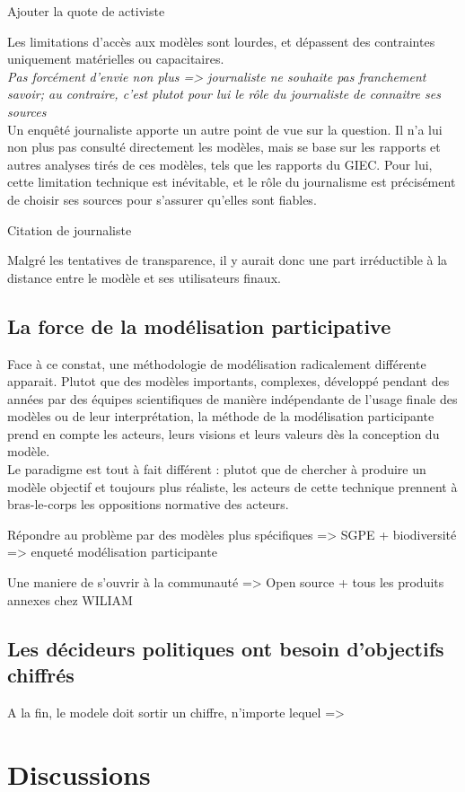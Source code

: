 \begin{displayquote}
    Ajouter la quote de activiste
\end{displayquote}

Les limitations d'accès aux modèles sont lourdes, et dépassent des contraintes uniquement matérielles ou capacitaires. \\

\textit{Pas forcément d'envie non plus
=> journaliste ne souhaite pas franchement savoir; au contraire, c'est plutot pour lui le rôle du journaliste de connaitre ses sources} \\

Un enquêté journaliste apporte un autre point de vue sur la question. Il n'a lui non plus pas consulté directement les modèles, mais se base sur les rapports et autres analyses tirés de ces modèles, tels que les rapports du GIEC. Pour lui, cette limitation technique est inévitable, et le rôle du journalisme est précisément de choisir ses sources pour s'assurer qu'elles sont fiables. 

\begin{displayquote}
    Citation de journaliste
\end{displayquote}

Malgré les tentatives de transparence, il y aurait donc une part irréductible à la distance entre le modèle et ses utilisateurs finaux. 

\subsection{La force de la modélisation participative}

Face à ce constat, une méthodologie de modélisation radicalement différente apparait. Plutot que des modèles importants, complexes, développé pendant des années par des équipes scientifiques de manière indépendante de l'usage finale des modèles ou de leur interprétation, la méthode de la modélisation participante prend en compte les acteurs, leurs visions et leurs valeurs dès la conception du modèle. \\

Le paradigme est tout à fait différent : plutot que de chercher à produire un modèle objectif et toujours plus réaliste, les acteurs de cette technique prennent à bras-le-corps les oppositions normative des acteurs. 

Répondre au problème par des modèles plus spécifiques
=> SGPE + biodiversité
=> enqueté modélisation participante

Une maniere de s'ouvrir à la communauté
=> Open source + tous les produits annexes chez WILIAM

\subsection{Les décideurs politiques ont besoin d'objectifs chiffrés}

A la fin, le modele doit sortir un chiffre, n'importe lequel
=> 


\section{Discussions}








